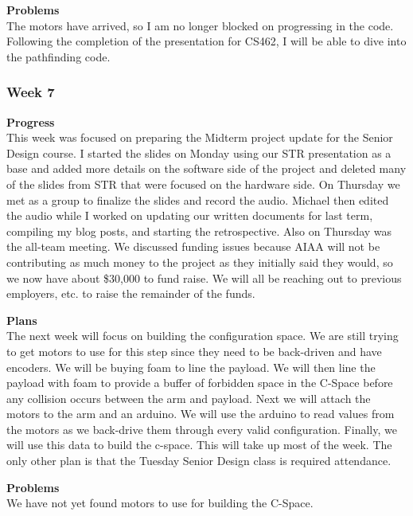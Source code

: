 \textbf{Problems} \\ 
The motors have arrived, so I am no longer blocked on progressing in the code. Following the completion of the presentation for CS462, I will be able to dive into the pathfinding code.

\subsubsection{Week 7}
\textbf{Progress} \\ 
This week was focused on preparing the Midterm project update for the Senior Design course. I started the slides on Monday using our STR presentation as a base and added more details on the software side of the project and deleted many of the slides from STR that were focused on the hardware side. On Thursday we met as a group to finalize the slides and record the audio. Michael then edited the audio while I worked on updating our written documents for last term, compiling my blog posts, and starting the retrospective. Also on Thursday was the all-team meeting. We discussed funding issues because AIAA will not be contributing as much money to the project as they initially said they would, so we now have about \$30,000 to fund raise. We will all be reaching out to previous employers, etc. to raise the remainder of the funds.

\textbf{Plans} \\ 
The next week will focus on building the configuration space. We are still trying to get motors to use for this step since they need to be back-driven and have encoders. We will be buying foam to line the payload. We will then line the payload with foam to provide a buffer of forbidden space in the C-Space before any collision occurs between the arm and payload. Next we will attach the motors to the arm and an arduino. We will use the arduino to read values from the motors as we back-drive them through every valid configuration. Finally, we will use this data to build the c-space. This will take up most of the week. The only other plan is that the Tuesday Senior Design class is required attendance.

\textbf{Problems} \\ 
We have not yet found motors to use for building the C-Space.


